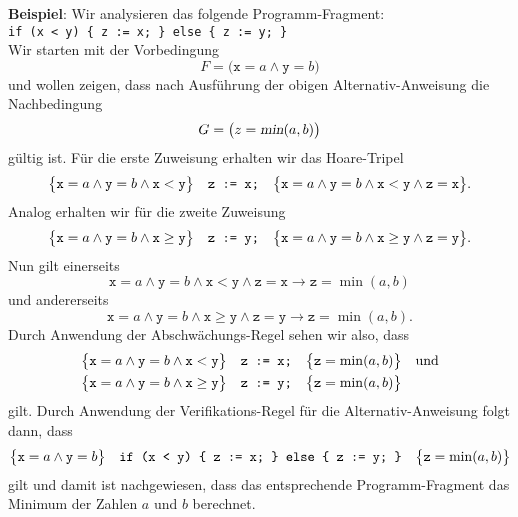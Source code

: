 \noindent
\textbf{Beispiel}:  Wir analysieren das folgende Programm-Fragment:
\\[0.2cm]
\hspace*{1.3cm}
\texttt{if (x < y) \{ z := x; \} else \{ z := y; \}}
\\[0.2cm]
Wir starten mit der Vorbedingung 
\[ F = \bigl(\texttt{x} = a \wedge \texttt{y} = b\bigr) \]
und wollen zeigen, dass nach Ausf\"uhrung der obigen Alternativ-Anweisung die Nachbedingung
\[ G = \bigl(z = \textsl{min}(a, b)\bigr) \]
g\"ultig ist.  F\"ur die erste Zuweisung erhalten wir das Hoare-Tripel 
\[ \bigl\{\texttt{x} = a \wedge \texttt{y} = b \wedge \texttt{x} < \texttt{y}\bigr\}\quad\texttt{z := x;}\quad\bigl\{
          \texttt{x} = a \wedge \texttt{y} = b \wedge \texttt{x} < \texttt{y} \wedge 
          \texttt{z} = \texttt{x}\bigr\}.
\]
Analog erhalten wir f\"ur die zweite Zuweisung
\[ \bigl\{\texttt{x} = a \wedge \texttt{y} = b \wedge \texttt{x} \geq \texttt{y}\bigr\}\quad\texttt{z := y;}\quad\bigl\{
          \texttt{x} = a \wedge \texttt{y} = b \wedge \texttt{x} \geq \texttt{y} \wedge
          \texttt{z} = \texttt{y}\bigr\}.
\]
Nun gilt einerseits
\[ \texttt{x} = a \wedge \texttt{y} = b \wedge \texttt{x} < \texttt{y} \wedge \texttt{z} = \texttt{x} 
   \rightarrow \texttt{z} = \min(a,b)
\]
und andererseits
\[ \texttt{x} = a \wedge \texttt{y} = b \wedge \texttt{x} \geq \texttt{y} \wedge \texttt{z} = \texttt{y} 
   \rightarrow \texttt{z} = \min(a,b).
\]
Durch Anwendung der Abschw\"achungs-Regel sehen wir also, dass
\begin{eqnarray*}
\bigl\{\texttt{x} = a \wedge \texttt{y} = b \wedge \texttt{x} < \texttt{y}\bigr\}\quad\texttt{z := x;}\quad\bigl\{
       \texttt{z} = \min(a,b)\bigr\} & & \mathrm{und} \\
\bigl\{\texttt{x} = a \wedge \texttt{y} = b \wedge \texttt{x} \geq \texttt{y}\bigr\}\quad\texttt{z := y;}\quad\bigl\{
          \texttt{z} = \min(a,b)\bigr\}
\end{eqnarray*}
gilt. Durch Anwendung der Verifikations-Regel f\"ur die Alternativ-Anweisung folgt dann, dass
\[ \bigl\{\texttt{x} = a \wedge \texttt{y} = b\bigr\}\quad\texttt{if (x < y) \{ z := x; \} else \{ z := y; \}}\quad\bigl\{
          \texttt{z} = \min(a,b)\bigr\}
\]
gilt und damit ist nachgewiesen, dass das entsprechende Programm-Fragment
das Minimum der Zahlen $a$ und $b$ berechnet.

